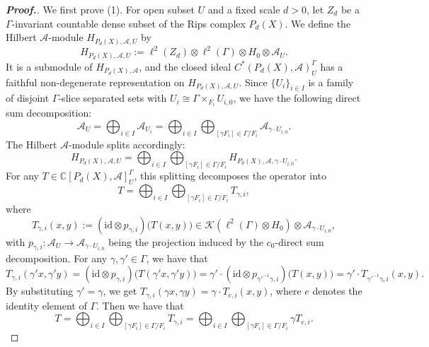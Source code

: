 \documentclass[pdflatex]{sn-jnl}
\theoremstyle{plain}
\theoremstyle{definition}
\begin{document}
\begin{proof}[\textbf{Proof.}]\normalsize
We first prove (1). For open subset $U$ and a fixed scale $d>0$, let $Z_{d}$ be a $\Gamma$-invariant countable dense subset of the Rips complex $P_{d}(X)$. We define the Hilbert $\mathcal{A}$-module $H_{P_{d}(X),\mathcal{A},U}$ by$$H_{P_{d}(X),\mathcal{A},U}:=\ell^{2}(Z_{d}) \otimes \ell^{2}(\Gamma)\otimes H_{0}\otimes\mathcal{A}_{U}.$$
It is a submodule of $H_{P_{d}(X),\mathcal{A}}$, and the closed ideal $C^{*}(P_{d}(X),\mathcal{A})_U^\Gamma$ has a faithful non-degenerate representation on $H_{P_{d}(X),\mathcal{A},U}$.
Since $\{U_i\}_{i\in I}$ is a family of disjoint $\Gamma$-slice separated sets with $U_i\cong\Gamma \times_{F_i} U_{i,0}$, we have the following direct sum decomposition:
\[\mathcal{A}_U=\bigoplus_{i\in I}\mathcal{A}_{U_i}=\bigoplus_{i\in I}\bigoplus_{[\gamma F_{i}]\in\Gamma/F_i}\mathcal{A}_{\gamma\cdot U_{i,0}}.\] 
The Hilbert $\mathcal{A}$-module splits accordingly:
\[H_{P_{d}(X),\mathcal{A},U}=\bigoplus_{i\in I}\bigoplus_{[\gamma F_{i}]\in\Gamma/F_i} H_{P_{d}(X),\mathcal{A},\gamma\cdot U_{i,0}}.\]
For any $T\in\mathbb{C}[P_{d}(X),\mathcal{A}]_U^\Gamma$, this splitting decomposes the operator into
\[T=\bigoplus_{i\in I}\bigoplus_{[\gamma F_{i}]\in \Gamma/F_i}T_{\gamma,i},\]
where \[T_{\gamma,i}(x,y):=(\mathrm{id}\otimes p_{\gamma,i})\bigl(T(x,y)\bigr)\in\mathcal{K}(\ell^2(\Gamma)\otimes H_0)\otimes\mathcal{A}_{\gamma\cdot U_{i,0}},\]
with $p_{\gamma,i}:\mathcal{A}_U\to \mathcal{A}_{\gamma\cdot U_{i,0}}$ being the projection induced by the $c_0$-direct sum decomposition.
For any $\gamma,\gamma'\in\Gamma$, we have that
\[T_{\gamma,i}(\gamma'x,\gamma'y)=(\mathrm{id}\otimes p_{\gamma,i})\bigl(T(\gamma' x,\gamma' y)\bigr)=\gamma'\cdot(\mathrm{id}\otimes p_{\gamma'^{-1}\gamma,i})\bigl(T(x, y)\bigr)=\gamma'\cdot T_{\gamma'^{-1}\gamma,i}(x, y).\]
By substituting $\gamma'=\gamma$, we get
$T_{\gamma,i}(\gamma x,\gamma y)=\gamma\cdot T_{e,i}(x, y)$,
where $e$ denotes the identity element of $\Gamma$. Then we have that
\[T=\bigoplus_{i\in I}\bigoplus_{[\gamma F_{i}]\in \Gamma/F_i}T_{\gamma,i}=\bigoplus_{i\in I}\bigoplus_{[\gamma F_{i}]\in\Gamma/F_i}\gamma T_{e,i}.\]


\end{proof}
\end{document}
